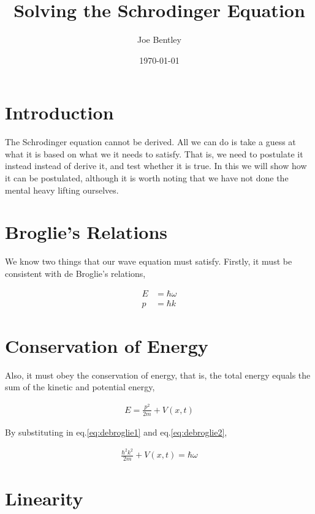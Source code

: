 \documentclass[11pt]{amsart}
\title{Solving the Schrodinger Equation}
\author{Joe Bentley}
\date{\today}
\begin{document}
\maketitle

\newpage

\section{Introduction}

The Schrodinger equation cannot be derived. All we can do is take a guess at what it is based on what we it needs to satisfy. That is, we need to postulate it instead instead of derive it, and test whether it is true. In this we will show how it can be postulated, although it is worth noting that we have not done the mental heavy lifting ourselves.

\section{Broglie's Relations}

We know two things that our wave equation must satisfy. Firstly, it must be consistent with de Broglie's relations,

\begin{align}
\label{eq:debroglie1}
E &= \hbar \omega \\
\label{eq:debroglie2}
p &= \hbar k
\end{align}

\section{Conservation of Energy}

Also, it must obey the conservation of energy, that is, the total energy equals the sum of the kinetic and potential energy,

\begin{align}
\label{eq:conservation}
E = \frac{p^2}{2m} + V(x, t)
\end{align}

By substituting in eq.\ref{eq:debroglie1} and eq.\ref{eq:debroglie2},

\begin{align}
\label{eq:energy}
\frac{\hbar^2 k^2}{2m} + V(x, t) = \hbar \omega
\end{align}

\section{Linearity}
\end{document}
